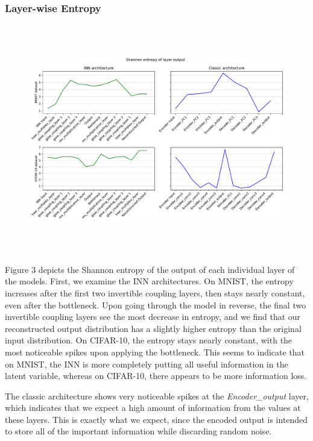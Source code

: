 \documentclass[11pt,letterpaper]{article}
\begin{document}
     \subsubsection{Layer-wise Entropy}
     \begin{figure}[!htb]
     \begin{center}
        \caption{}
        \includegraphics[height=10cm]{./pics/layer_entropies.pdf}
     \end{center}
     \end{figure}
     Figure 3 depicts the Shannon entropy of the output of each individual layer of the models.
     First, we examine the INN architectures.
     On MNIST, the entropy increases after the first two invertible coupling layers, then stays nearly constant, even after the bottleneck.
     Upon going through the model in reverse, the final two invertible coupling layers see the most decrease in entropy, and we find that our reconstructed output distribution has a slightly higher entropy than the original input distribution.
     On CIFAR-10, the entropy stays nearly constant, with the most noticeable spikes upon applying the bottleneck.
     This seems to indicate that on MNIST, the INN is more completely putting all useful information in the latent variable, whereas on CIFAR-10, there appears to be more information loss.

     The classic architecture shows very noticeable spikes at the \textit{Encoder\_output} layer, which indicates that we expect a high amount of information from the values at these layers.
     This is exactly what we expect, since the encoded output is intended to store all of the important information while discarding random noise.
\end{document}
